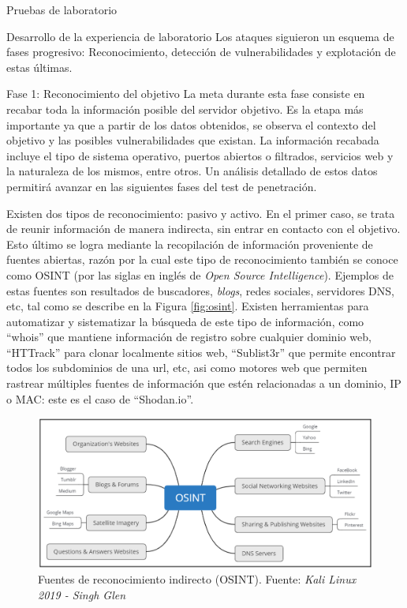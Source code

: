 \begin{section}{Pruebas de laboratorio}
\begin{subsection}{Desarrollo de la experiencia de laboratorio}
    Los ataques siguieron un esquema de fases progresivo: Reconocimiento, detección de vulnerabilidades y explotación de estas últimas.
    \begin{subsubsection}{Fase 1: Reconocimiento del objetivo}
    La meta durante esta fase consiste en recabar toda la información posible del servidor objetivo. Es la etapa más importante ya que a partir de los datos obtenidos, se observa el contexto del objetivo y las posibles vulnerabilidades que existan. La información recabada incluye el tipo de sistema operativo, puertos abiertos o filtrados, servicios web y la naturaleza de los mismos, entre otros. Un análisis detallado de estos datos permitirá avanzar en las siguientes fases del test de penetración.\par
    Existen dos tipos de reconocimiento: pasivo y activo. En el primer caso, se trata de reunir información de manera indirecta, sin entrar en contacto con el objetivo. Esto último se logra mediante la recopilación de información proveniente de fuentes abiertas, razón por la cual este tipo de reconocimiento también se conoce como OSINT (por las siglas en inglés de \textit{Open Source Intelligence}). Ejemplos de estas fuentes son resultados de buscadores, \textit{blogs}, redes sociales, servidores DNS, etc, tal como se describe en la Figura \ref{fig:osint}. Existen herramientas para automatizar y sistematizar la búsqueda de este tipo de información, como “whois” que mantiene información de registro sobre cualquier dominio web, “HTTrack” para clonar localmente sitios web, “Sublist3r” que permite encontrar todos los subdominios de una url, etc, asi como motores web que permiten rastrear múltiples fuentes de información que estén relacionadas a un dominio, IP o MAC: este es el caso de “Shodan.io”.
    \begin{figure}[H]
    \centering
    \includegraphics[width=1\textwidth]{./iteracion_3_imagenes/OSINT.png}
    \caption{Fuentes de reconocimiento indirecto (OSINT). Fuente: \textit{Kali Linux 2019 - Singh Glen}}

\end{figure}
\end{subsubsection}
\end{subsection}
\end{section}
